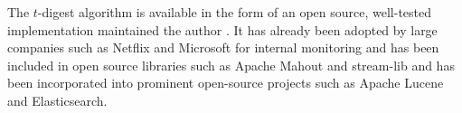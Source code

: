 \documentclass[]{statsoc}
\begin{document}
The $t$-digest algorithm is available in the form of an open source, well-tested implementation maintained the author \citep{t-digest-project}.  It has already been adopted by large companies such as Netflix and Microsoft for internal monitoring and has been included in open source libraries such as Apache Mahout and stream-lib and has been incorporated into prominent open-source projects such as Apache Lucene and Elasticsearch.



{}
\end{document}
